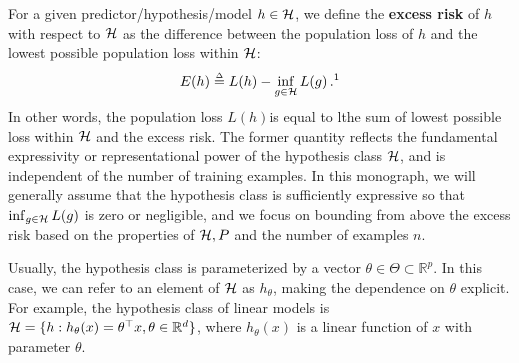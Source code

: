 For a given predictor/hypothesis/model $h \in \mathcal H$, we define the \textbf{excess risk} of $h$ with respect to $\mathcal H$ as the difference between the population loss of $h$ and the lowest possible population loss within $\mathcal H$:
\begin{align}
E(h) \defeq{} L(h) - \inf_{g\in\cH} L(g)\,.\text{\footnotemark}
\end{align}
In other words, the population loss $L(h)$is equal to lthe sum of lowest possible loss within $\mathcal H$ and the excess risk.  The former quantity reflects the fundamental expressivity or representational power of the hypothesis class $\mathcal H$, and is independent of the number of training examples. In this monograph, we will generally assume that the hypothesis class is sufficiently expressive so that $\inf_{g\in\mathcal H} L(g)$ is zero or negligible, and we focus on bounding from above the excess risk based on the properties of $\mathcal H, P$ and the number of examples $n$.  

Usually, the hypothesis class is parameterized by a vector $\theta \in \Theta \subset \mathbb{R}^p$. In this case, we can refer to an element of $\mathcal H$ as $h_\theta$, making the dependence on $\theta$ explicit. For example, the hypothesis class of linear models is $\mathcal H = \{ h: h_\theta(x) = \theta^\top x, \theta \in \mathbb{R}^d \}$, where $h_\theta(x)$ is a linear function of $x$ with parameter $\theta$.



